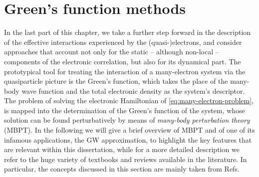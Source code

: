 \section{Green's function methods\label{sec:green-function-methods}}
In the last part of this chapter, we take a further step forward in the description of the effective interactions experienced by the (quasi-)electrons, and consider approaches that account not only for the static -- although non-local -- components of the electronic correlation, but also for its dynamical part. The prototypical tool for treating the interaction of a many-electron system via the quasiparticle picture is the Green's function, which takes the place of the many-body wave function and the total electronic density as the system's descriptor. The problem of solving the electronic Hamiltonian of \cref{eq:many-electron-problem}, is mapped into the determination of the Green's function of the system, whose solution can be found perturbatively by means of \emph{many-body perturbation theory} (MBPT). In the following we will give a brief overview of MBPT and of one of its infamous applications, the GW approximation, to highlight the key features that are relevant within this dissertation, while for a more detailed description we refer to the huge variety of textbooks and reviews available in the literature. In particular, the concepts discussed in this section are mainly taken from Refs.~\cite{martin_interacting_2016,fetter_quantum_1971,reining_gw_2018,onida_electronic_2002}

